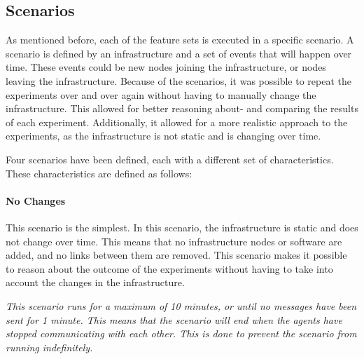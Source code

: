 \subsection{Scenarios}
As mentioned before, each of the feature sets is executed in a specific scenario. A scenario is defined by an infrastructure and a set of events that will happen over time. These events could be new nodes joining the infrastructure, or nodes leaving the infrastructure. Because of the scenarios, it was possible to repeat the experiments over and over again without having to manually change the infrastructure. This allowed for better reasoning about- and comparing the results of each experiment. Additionally, it allowed for a more realistic approach to the experiments, as the infrastructure is not static and is changing over time.

Four scenarios have been defined, each with a different set of characteristics. These characteristics are defined as follows:


\paragraph*{No Changes}
This scenario is the simplest. In this scenario, the infrastructure is static and does not change over time. This means that no infrastructure nodes or software are added, and no links between them are removed. This scenario makes it possible to reason about the outcome of the experiments without having to take into account the changes in the infrastructure. 

\textit{This scenario runs for a maximum of 10 minutes, or until no messages have been sent for 1 minute. This means that the scenario will end when the agents have stopped communicating with each other. This is done to prevent the scenario from running indefinitely.}

